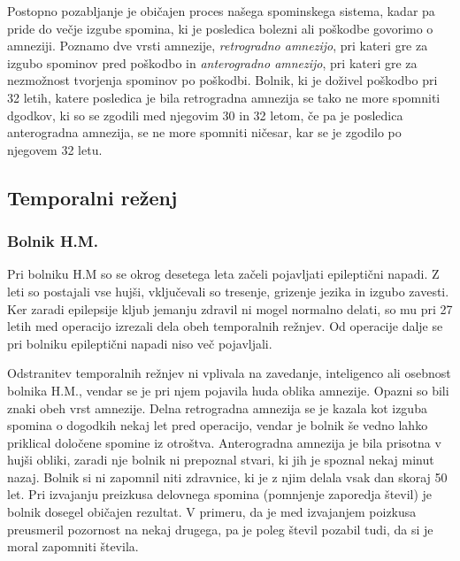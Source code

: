 \documentclass[10pt,a4paper]{article}
\begin{document}
Postopno pozabljanje je običajen proces našega spominskega sistema, kadar pa pride do večje izgube spomina, ki je posledica bolezni ali poškodbe govorimo o amneziji. Poznamo dve vrsti amnezije, {\it retrogradno amnezijo}, pri kateri gre za izgubo spominov pred poškodbo in {\it anterogradno amnezijo}, pri kateri gre za nezmožnost tvorjenja spominov po poškodbi. Bolnik, ki je doživel poškodbo pri 32 letih, katere posledica je bila retrogradna amnezija se tako ne more spomniti dgodkov, ki so se zgodili med njegovim 30 in 32 letom, če pa je posledica anterogradna amnezija, se ne more spomniti ničesar, kar se je zgodilo po njegovem 32 letu.

\subsection{Temporalni reženj}
\subsubsection{Bolnik H.M.}
Pri bolniku H.M so se okrog desetega leta začeli pojavljati epileptični napadi. Z leti so postajali vse hujši, vključevali so tresenje, grizenje jezika in izgubo zavesti. Ker zaradi epilepsije kljub jemanju zdravil ni mogel normalno delati, so mu pri 27 letih med operacijo izrezali dela obeh temporalnih režnjev. Od operacije dalje se pri bolniku epileptični napadi niso več pojavljali.

Odstranitev temporalnih režnjev ni vplivala na zavedanje, inteligenco ali osebnost bolnika H.M., vendar se je pri njem pojavila huda oblika amnezije. Opazni so bili znaki obeh vrst amnezije. Delna retrogradna amnezija se je kazala kot izguba spomina o dogodkih nekaj let pred operacijo, vendar je bolnik še vedno lahko priklical določene spomine iz otroštva. Anterogradna amnezija je bila prisotna v hujši obliki, zaradi nje bolnik ni prepoznal stvari, ki jih je spoznal nekaj minut nazaj. Bolnik si ni zapomnil niti zdravnice, ki je z njim delala vsak dan skoraj 50 let. Pri izvajanju preizkusa delovnega spomina (pomnjenje zaporedja števil) je bolnik dosegel običajen rezultat. V primeru, da je med izvajanjem poizkusa preusmeril pozornost na nekaj drugega, pa je poleg števil pozabil tudi, da si je moral zapomniti števila.
\end{document}
